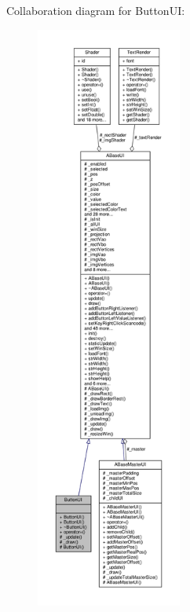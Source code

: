 Collaboration diagram for Button\+UI\+:
\nopagebreak
\begin{figure}[H]
\begin{center}
\leavevmode
\includegraphics[height=550pt]{class_button_u_i__coll__graph}
\end{center}
\end{figure}
